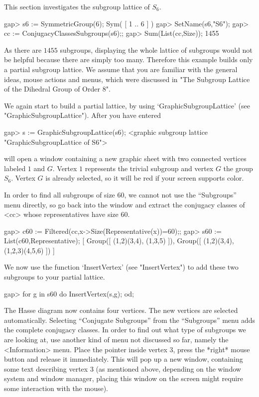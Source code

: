 This section investigates the subgroup lattice of $S_6$.

\begintt
gap> s6 := SymmetricGroup(6);
Sym( [ 1 .. 6 ] )
gap> SetName(s6,"S6");
gap> cc := ConjugacyClassesSubgroups(s6);;
gap> Sum(List(cc,Size));
1455
\endtt

As there are $1455$ subgroups,  displaying  the whole lattice of  subgroups
would not  be helpful because  there are simply  too many.   Therefore this
example builds only a partial  subgroup lattice.   We  assume that you  are
familiar with  the  general ideas,  mouse   actions and  menus, which  were
discussed in "The Subgroup Lattice of the Dihedral Group of Order 8".

We again start to build a partial lattice, by using
`GraphicSubgroupLattice' (see "GraphicSubgroupLattice").  After you have
entered

\begintt
gap> s := GraphicSubgroupLattice(s6);
<graphic subgroup lattice "GraphicSubgroupLattice of S6">
\endtt

{\XGAP}  will open  a window  containing  a new  graphic  sheet with  two
connected vertices   labeled  $1$ and $G$.     Vertex  $1$ represents the
trivial subgroup and  vertex $G$ the group $S_6$.   Vertex $G$ is already
selected, so it will be red if your screen supports color.

In order  to  find all subgroups   of size $60$, we  cannot   not use the
``Subgroups'' menu directly, so go back into the  {\GAP} window and extract
the conjugacy classes of <cc> whose representatives have size $60$.

\begintt
gap> c60 := Filtered(cc,x->Size(Representative(x))=60);;
gap> s60 := List(c60,Representative);
[ Group([ (1,2)(3,4), (1,3,5) ]), Group([ (1,2)(3,4), (1,2,3)(4,5,6) ]) ]
\endtt

\label{xgapgap}
We now use the function `InsertVertex' (see "InsertVertex") to add
these two subgroups to your partial lattice.

\begintt
gap> for g in s60 do InsertVertex(s,g); od;
\endtt

The Hasse diagram now contains four vertices.
The new vertices are selected automatically.  Selecting ``Conjugate
Subgroups'' from the ``Subgroups'' menu adds the complete conjugacy classes.
In order to find out what type of subgroups we  are looking at, use another
kind of menu not  discussed so far,  namely the <Information>  menu.  Place
the pointer inside  vertex $3$, press the  *right* mouse button and release
it immediately.  This  will  pop  up a new   window,  containing some  text
describing vertex $3$  (as mentioned above,  depending on the window system
and  window manager, placing this  window on the  screen might require some
interaction with the mouse).

